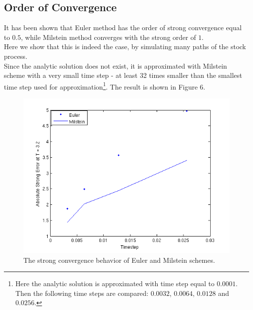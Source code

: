 \documentclass[11pt]{report}
\begin{document}
\subsection{Order of Convergence}
It has been shown that Euler method has the order of strong convergence equal to $0.5$, while Milstein method converges with the strong order of $1$.\\
Here we show that this is indeed the case, by simulating many paths of the stock process.\\ Since the analytic solution does not exist, it is approximated with Milstein scheme with a very small time step - at least 32 times smaller than the smallest time step used for approximation\footnote{Here the analytic solution is approximated with time step equal to $0.0001$. Then the following time steps are compared: $0.0032$, $0.0064$, $0.0128$ and $0.0256$.}.
The result is shown in Figure 6.
 \begin{figure}[h]
 \includegraphics{Figures/euler_milstein.png}
 \caption{The strong convergence behavior of Euler and Milstein schemes.}
\end{figure}
\clearpage
\end{document}
